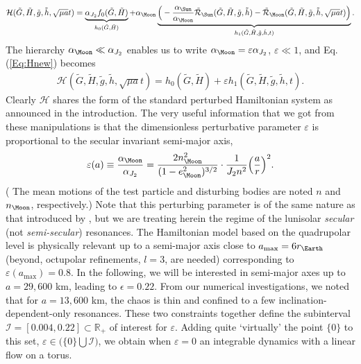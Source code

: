 \documentclass{amsart}
\theoremstyle{definition}
\theoremstyle{remark}
\numberwithin{equation}{section}
\begin{document}
\begin{align}\label{Eq:Hnew}
	\mathcal{H}(\tilde{G},\tilde{H},\tilde{g},\tilde{h},\sqrt{\mu a}t) =
	\underbrace{\alpha_{J_{2}} f_{0}(\tilde{G},\tilde{H})}_{
	h_{0}(\tilde{G},\tilde{H})}
	 + \alpha_{\Moon}
	\underbrace{
	\Big(
	-\frac{\alpha_{\Sun}}{\alpha_{\Moon}} \tilde{\mathcal{R}}_{\Sun}(\tilde{G},\tilde{H},\tilde{g},\tilde{h})
	-
\tilde{\mathcal{R}}_{\Moon}(\tilde{G},\tilde{H},\tilde{g},\tilde{h},\sqrt{\mu a}t)
	\Big)}_{
	h_{1}(\tilde{G},\tilde{H},\tilde{g},\tilde{h},t)
	}
	.
\end{align}
The hierarchy $\alpha_{\Moon} \ll \alpha_{J_{2}}$ enables us to write $\alpha_{\Moon} = \varepsilon \alpha_{J_{2}}$, $\varepsilon \ll 1$, and Eq.\,(\ref{Eq:Hnew}) becomes
\begin{align}\label{Eq:Hfinal}
	\mathcal{H}(\tilde{G},\tilde{H},\tilde{g},\tilde{h},\sqrt{\mu a}t) =
	h_{0}(\tilde{G},\tilde{H}) + \varepsilon h_{1}(\tilde{G},\tilde{H},\tilde{g},\tilde{h},t).
\end{align} 
Clearly $\mathcal{H}$ shares the form of {\color{black}the} standard perturbed Hamiltonian system as announced in the introduction. 
The very useful information that we got from these manipulations is that the dimensionless perturbative parameter $\varepsilon$ is proportional to the secular invariant semi-major axis, 
\begin{align}
	\varepsilon(a) \equiv \frac{\alpha_{\Moon}}{\alpha_{J_{2}}} = \frac{2n^{2}_{\Moon}}{(1-e_{\Moon}^{2})^{3/2}} 
	\cdot
\frac{1}{J_{2}n^{2}} 
\Big(
\frac{a}{r}
\Big)^{2}.
\end{align}
({\color{black} The mean motions of the test particle and disturbing bodies are noted $n$ and $n_{\Moon}$, respectively.}) Note that this perturbing parameter is of the same nature as {\color{black} that} introduced by \cite{sBr01}, {\color{black}but we are treating herein the regime of the lunisolar {\it secular} (not {\it semi-secular}) resonances}. 
The Hamiltonian model based on the quadrupolar level is physically relevant up to a semi-major axis close to  $a_{\max} = 6 r_{\Earth}$ (beyond, octupolar refinements, $l=3$, are needed) corresponding to $\varepsilon(a_{\max})=0.8$. In the following, we will be interested in semi-major axes up to $a=29,600$ km, leading to $\epsilon=0.22$.
From our numerical investigations, we noted that  for $a=13,600$ km, the chaos is thin and confined to a few inclination-dependent-only resonances. These two constraints together define the subinterval $\mathcal{I}=[0.004,0.22] \subset \mathbb{R}_{+}$ of interest for $\varepsilon$. Adding quite `virtually' the point $\{0\}$ to this set,  $\varepsilon \in \Big(\{0\}\bigcup \mathcal{I}\Big)$, we obtain  when $\varepsilon=0$ an integrable dynamics with a linear flow on a torus. 
\end{document}
